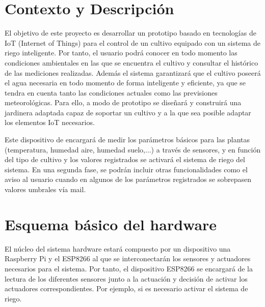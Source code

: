 \documentclass[12pt,a4paper,titlepage,oneside]{report}
\title{\titulo}
\author{\autor}
\begin{document}



\tableofcontents
\listoffigures

\chapter{Contexto y Descripción}
	El objetivo de este proyecto es desarrollar un prototipo basado en tecnologías de IoT (Internet of Things) para el control de un cultivo equipado con un sistema de riego inteligente. Por tanto, el usuario podrá conocer en todo momento las condiciones ambientales en las que se encuentra el cultivo y consultar el histórico de las mediciones realizadas. Además el sistema garantizará que el cultivo poseerá el agua necesaria en todo momento de forma inteligente y eficiente, ya que se tendra en cuenta tanto las condiciones actuales como las previsiones meteorológicas. Para ello, a modo de prototipo se diseñará y construirá una jardinera adaptada capaz de soportar un cultivo y a la que sea posible adaptar los elementos IoT necesarios.


	Este dispositivo de encargará de medir los parámetros básicos para las plantas (temperatura, humedad aire, humedad suelo,...) a través de sensores, y en función del tipo de cultivo y los valores registrados  se activará el sistema de riego del sistema. En una segunda fase, se podrán incluir otras funcionalidades como el aviso al usuario cuando en algunos de los parámetros registrados se sobrepasen valores umbrales vía mail.



\chapter{Esquema básico del hardware}

	El núcleo del sistema hardware estará compuesto por un dispositivo una Raspberry Pi y el ESP8266 al que se interconectarán los sensores y actuadores necesarios para el sistema. Por tanto, el dispositivo ESP8266 se encargará de la lectura de los diferentes sensores junto a la actuación y decisión de activar los actuadores correspondientes. Por ejemplo, si es necesario activar el sistema de riego.
\end{document}
